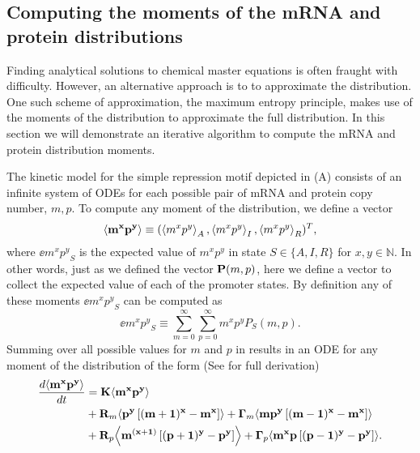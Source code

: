 \subsection{Computing the moments of the mRNA and protein distributions}
\label{sec_moments}

Finding analytical solutions to chemical master equations is often fraught with
difficulty. However, an alternative approach is to to approximate the
distribution. One such scheme of approximation, the maximum entropy principle,
makes use of the moments of the distribution to approximate the full
distribution. In this section we will demonstrate an iterative algorithm to
compute the mRNA and protein distribution moments.

The kinetic model for the simple repression motif depicted in
(A) consists of an infinite system of ODEs for each
possible pair of mRNA and protein copy number, $m, p$. To compute any moment of
the distribution, we define a vector
\begin{equation}
	\left\langle \mathbf{m^x p^y} \right\rangle \equiv (\left\langle m^x p^y \right\rangle_A, \left\langle m^x p^y \right\rangle_I, \left\langle m^x p^y \right\rangle_R)^T,
\end{equation}
where $\ee{m^x p^y}_S$ is the expected value of $m^x p^y$ in state $S \in \{A,
I, R\}$ for $x, y \in \mathbb{N}$. In other words, just as we defined the
vector $\mathbf{P}(m, p)$, here we define a vector to collect the expected value of
each of the promoter states. By definition any of these moments $\ee{m^x
p^y}_S$ can be computed as
\begin{equation}
  \ee{m^x p^y}_S \equiv \sum_{m=0}^\infty \sum_{p=0}^\infty m^x p^y P_S(m, p).
  \label{eq_mom_def}
\end{equation}
Summing over all possible values for $m$ and $p$ in 
results in an ODE for any moment of the distribution of the form (See
 for full derivation)
\begin{equation}
  \begin{aligned}
    {d{\mathbf{\left\langle m^x p^y \right\rangle}} \over dt} &=
    \mathbf{K} \mathbf{\left\langle m^x p^y \right\rangle}\\
    &+ \mathbf{R}_m \mathbf{\left\langle p^y \left[ (m + 1)^x -m^x \right] \right\rangle}
     + \mathbf{\Gamma}_m \mathbf{\left\langle m p^y \left[ (m - 1)^x - m^x \right] \right\rangle}\\
    &+ \mathbf{R}_p \mathbf{\left\langle m^{(x + 1)} \left[ (p + 1)^y - p^y \right] \right\rangle}
     + \mathbf{\Gamma}_p \mathbf{\left\langle m^x p \left[ (p - 1)^y - p^y \right] \right\rangle}.
    \label{eq_gral_mom}
  \end{aligned}
\end{equation}

